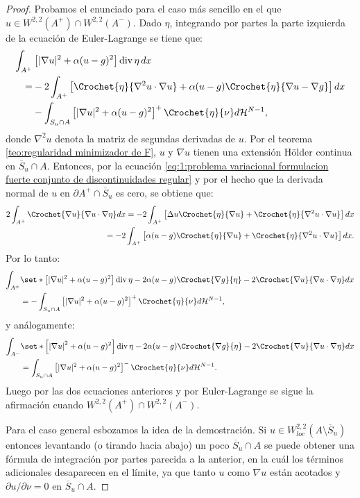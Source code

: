 \documentclass[a4paper,11pt,spanish, twoside, leqno]{tfm-uam}
\begin{document}
\begin{proof}
Probamos el enunciado para el caso más sencillo en el que $u\in W^{2,2}(A^{+})\cap W^{2,2}(A^{-})$. Dado $\eta$, integrando por partes la parte izquierda de la ecuación de Euler-Lagrange se tiene que:
\begin{align*}
\int_{A^{+}}& \left [\abs{\nabla{u}}^{2}+\alpha (u-g)^{2}\right ]\div \eta\, dx\\
=&-2\int_{A^{+}}\left [ \Crochet{\eta}{\nabla^{2}u\cdot \nabla{u}}+\alpha (u-g) \Crochet{\eta}{\nabla{u}-\nabla{g}}\right]dx\\
&- \int_{S_{u}\cap A} \left [\abs{\nabla{u}}^{2}+\alpha (u-g)^{2} \right ]^{+}\Crochet{\eta}{\nu}d\Hm{N-1},
\end{align*}
donde $\nabla^{2}u$ denota la matriz de segundas derivadas de $u$. Por el teorema \ref{teo:regularidad minimizador de F}, $u$ y $\nabla{u}$ tienen una extensión Hölder continua en $\overline{S}_{u}\cap A$. Entonces, por la ecuación \ref{eq:1:problema variacional formulacion fuerte conjunto de discontinuidades regular} y por el hecho que la derivada normal de $u$ en $\partial A^{+}\cap \overline{S}_{u}$ es cero, se obtiene que:
\begin{align*}
2\int_{A^{+}}\Crochet{\nabla{u}}{\nabla{u}\cdot\nabla{\eta}}dx=-2\int_{A^{+}}\left [\Delta{u}\Crochet{\eta}{\nabla{u}}+\Crochet{\eta}{\nabla^{2}u\cdot \nabla{u}} \right ]dx\\
=-2\int_{A^{+}}\left [\alpha(u-g)\Crochet{\eta}{\nabla{u}}+\Crochet{\eta}{\nabla^{2}u\cdot\nabla{u}}\right ]dx.
\end{align*}
Por lo tanto:
\begin{align*}
\int_{A^{+}}&\set*{\left [ \abs{\nabla{u}}^{2}+\alpha(u-g)^{2}\right]}\div \eta -2\alpha(u-g)\Crochet{\nabla{g}}{\eta}-2\Crochet{\nabla{u}}{\nabla{u}\cdot \nabla{\eta}} dx\\
&=-\int_{S_{u}\cap A}\left [ \abs{\nabla{u}}^{2}+\alpha (u-g)^{2}\right]^{+} \Crochet{\eta}{\nu} d\Hm{N-1},
\end{align*}
y análogamente:
\begin{align*}
\int_{A^{-}}&\set*{\left [ \abs*{\nabla{u}}^{2}+\alpha (u-g)^{2}\right ]\div\eta -2\alpha(u-g)\Crochet{\nabla{g}}{\eta}-2\Crochet{\nabla{u}}{\nabla{u}\cdot\nabla{\eta}}}dx\\
&=\int_{S_{u}\cap A}\left [ \abs{\nabla{u}}^{2}+\alpha (u-g)^{2}\right ]^{-}\Crochet{\eta}{\nu} d\Hm{N-1}.
\end{align*}
Luego por las dos ecuaciones anteriores y por Euler-Lagrange se sigue la afirmación cuando $W^{2,2}(A^{+})\cap W^{2,2}(A^{-})$. 

Para el caso general esbozamos la idea de la demostración. Si $u\in W_{loc}^{2,2}(A\setminus \overline{S}_{u})$ entonces levantando (o tirando hacia abajo) un poco $\overline{S}_{u}\cap A$ se puede obtener una fórmula de integración por partes parecida a la anterior, en la cuál los términos adicionales desaparecen en el límite, ya que tanto $u$ como $\nabla{u}$ están acotados y $\partial u/\partial \nu =0$ en $\overline{S}_{u}\cap A$.
\end{proof}
\end{document}
